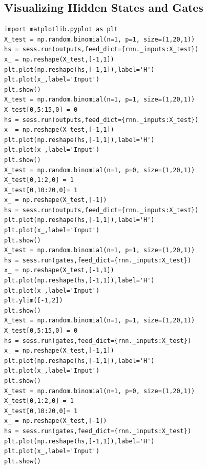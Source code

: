 \documentclass[12pt, letterpaper]{article}
\begin{document}
\subsection{Visualizing Hidden States and Gates}
\begin{verbatim}
import matplotlib.pyplot as plt
X_test = np.random.binomial(n=1, p=1, size=(1,20,1))
hs = sess.run(outputs,feed_dict={rnn._inputs:X_test})
x_ = np.reshape(X_test,[-1,1])
plt.plot(np.reshape(hs,[-1,1]),label='H')
plt.plot(x_,label='Input')
plt.show()
X_test = np.random.binomial(n=1, p=1, size=(1,20,1))
X_test[0,5:15,0] = 0
hs = sess.run(outputs,feed_dict={rnn._inputs:X_test})
x_ = np.reshape(X_test,[-1,1])
plt.plot(np.reshape(hs,[-1,1]),label='H')
plt.plot(x_,label='Input')
plt.show()
X_test = np.random.binomial(n=1, p=0, size=(1,20,1))
X_test[0,1:2,0] = 1
X_test[0,10:20,0]= 1
x_ = np.reshape(X_test,[-1])
hs = sess.run(outputs,feed_dict={rnn._inputs:X_test})
plt.plot(np.reshape(hs,[-1,1]),label='H')
plt.plot(x_,label='Input')
plt.show()
X_test = np.random.binomial(n=1, p=1, size=(1,20,1))
hs = sess.run(gates,feed_dict={rnn._inputs:X_test})
x_ = np.reshape(X_test,[-1,1])
plt.plot(np.reshape(hs,[-1,1]),label='H')
plt.plot(x_,label='Input')
plt.ylim([-1,2])
plt.show()
X_test = np.random.binomial(n=1, p=1, size=(1,20,1))
X_test[0,5:15,0] = 0
hs = sess.run(gates,feed_dict={rnn._inputs:X_test})
x_ = np.reshape(X_test,[-1,1])
plt.plot(np.reshape(hs,[-1,1]),label='H')
plt.plot(x_,label='Input')
plt.show()
X_test = np.random.binomial(n=1, p=0, size=(1,20,1))
X_test[0,1:2,0] = 1
X_test[0,10:20,0]= 1
x_ = np.reshape(X_test,[-1])
hs = sess.run(gates,feed_dict={rnn._inputs:X_test})
plt.plot(np.reshape(hs,[-1,1]),label='H')
plt.plot(x_,label='Input')
plt.show()
\end{verbatim}
\end{document}
